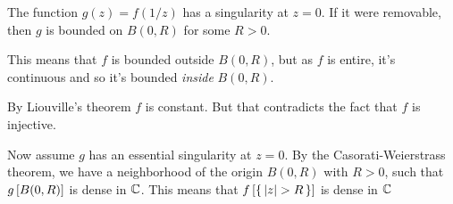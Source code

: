 \documentclass[12pt]{memoir}
\begin{document}
\begin{ptcbr}
The function $g(z)=f(1/z)$ has a singularity at $z=0$. If it were removable, then $g$ is bounded on $B(0,R)$ for some $R>0$.\par 
This means that $f$ is bounded outside $B(0,R)$, but as $f$ is entire, it's continuous and so it's bounded \emph{inside} $B(0,R)$.\par 
By Liouville's theorem $f$ is constant. But that contradicts the fact that $f$ is injective.\par 
Now assume $g$ has an essential singularity at $z=0$. By the Casorati-Weierstrass theorem, we have a neighborhood of the origin $B(0,R)$ with $R>0$, such that $g\left\lbrack B(0,R)\right\rbrack$ is dense in $\mathbb{C}$. This means that $f\bonj{\set{|z|>R}}$ is dense in $\mathbb{C}$
\end{ptcbr}
\end{document}
